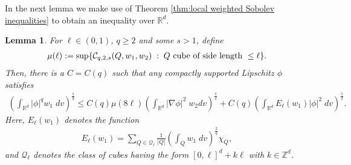 \documentclass[12pt,american]{amsart}
\numberwithin{equation}{section}
\theoremstyle{plain}
\newtheorem{lem}[thm]{Lemma}
\theoremstyle{definition}                  %
\begin{document}
In the next lemma we make use of Theorem \ref{thm:local weighted Sobolev inequalities} to obtain an inequality over $\mathbb{R}^d$. 
\begin{lem}\label{lem:Global weighted Sobolev from local ones}
  For $\ell\in(0,1)$, $q\geq 2$ and some $s>1$, define
  \begin{align*}
    \mu(\ell) := \sup \{   \mathcal{C}_{q,2,s}(Q,w_1,w_2) \;:\;	Q \textnormal{ cube of side length } \leq \ell \} .	  \end{align*}	  
  Then, there is a $C=C(q)$ such that any compactly supported Lipschitz $\phi$ satisfies 
  \begin{align*}
    \left ( \int_{\mathbb{R}^d}|\phi|^q w_1\;dv\right )^{\frac{1}{q}} \leq C(q)\mu(8\ell)\left ( \int_{\mathbb{R}^d}  |\nabla \phi|^2\; w_2 dv \right )^{\frac{1}{2}}+C(q)\left (\int_{\mathbb{R}^d}E_\ell(w_1)|\phi|^2\;dv \right )^{\frac{1}{2}}.
  \end{align*}
  Here, $E_{\ell}(w_1)$ denotes the function
  \begin{align*}
    E_\ell(w_1) = \sum \limits_{Q\in\mathcal{Q}_\ell} \frac{1}{|Q|}\left ( \int_{Q}w_1\;dv \right )^{\frac{2}{q}}\chi_{Q},  
  \end{align*}
  and $\mathcal{Q}_{\ell}$ denotes the class of cubes having the form $[0,\ell]^d+ k\ell$ with $k\in \mathbb{Z}^d$.
\end{lem}
\end{document}
